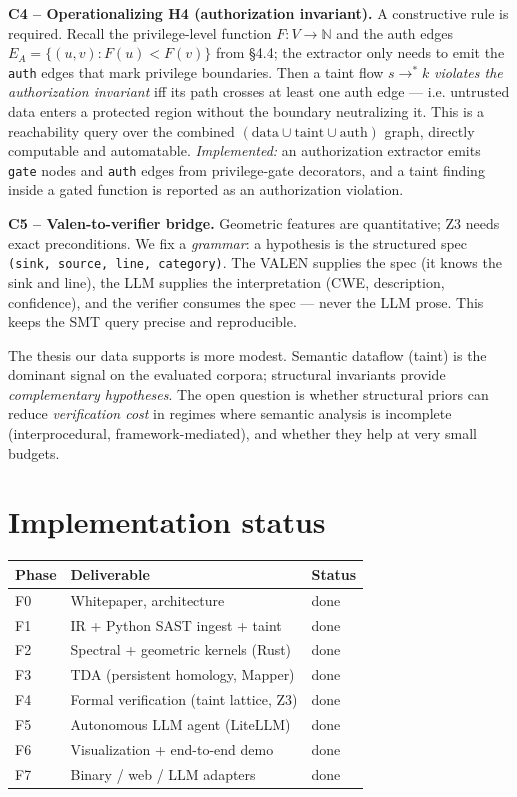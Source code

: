 \documentclass[11pt]{article}
\begin{document}
\textbf{C4 -- Operationalizing H4 (authorization invariant).} A constructive rule
is required. Recall the privilege-level function $F : V \to \mathbb{N}$ and the
auth edges $E_A = \{(u,v) : F(u) < F(v)\}$ from \S4.4; the extractor only needs to
emit the \texttt{auth} edges that mark privilege boundaries. Then a taint flow
$s \to^{*} k$ \emph{violates the authorization invariant} iff its path crosses at
least one auth edge --- i.e. untrusted data enters a protected region without the
boundary neutralizing it. This is a reachability query over
the combined $(\text{data} \cup \text{taint} \cup \text{auth})$ graph, directly
computable and automatable. \emph{Implemented:} an authorization extractor emits
\texttt{gate} nodes and \texttt{auth} edges from privilege-gate decorators, and a
taint finding inside a gated function is reported as an authorization violation.

\textbf{C5 -- Valen-to-verifier bridge.} Geometric features are
quantitative; Z3 needs exact preconditions. We fix a \emph{grammar}: a
hypothesis is the structured spec \texttt{(sink, source, line, category)}. The
VALEN supplies the spec (it knows the sink and line), the LLM supplies the
interpretation (CWE, description, confidence), and the verifier consumes the
spec --- never the LLM prose. This keeps the SMT query precise and reproducible.

The thesis our data supports is more modest. Semantic dataflow (taint) is the
dominant signal on the evaluated corpora; structural invariants provide
\emph{complementary hypotheses}. The open question is whether structural priors
can reduce \emph{verification cost} in regimes where semantic analysis is
incomplete (interprocedural, framework-mediated), and whether they help at very
small budgets.

\section{Implementation status}
\begin{center}
\begin{tabular}{lll}
\toprule
Phase & Deliverable & Status \\
\midrule
F0 & Whitepaper, architecture & done \\
F1 & IR + Python SAST ingest + taint & done \\
F2 & Spectral + geometric kernels (Rust) & done \\
F3 & TDA (persistent homology, Mapper) & done \\
F4 & Formal verification (taint lattice, Z3) & done \\
F5 & Autonomous LLM agent (LiteLLM) & done \\
F6 & Visualization + end-to-end demo & done \\
F7 & Binary / web / LLM adapters & done \\
\bottomrule
\end{tabular}
\end{center}
\end{document}
